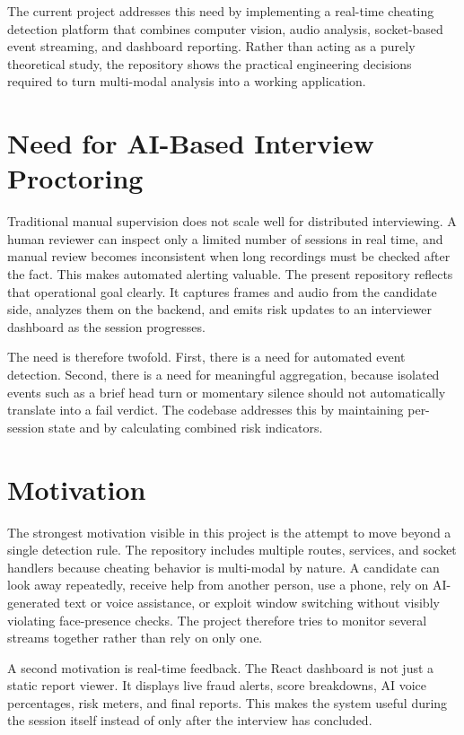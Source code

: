 \documentclass[12pt,a4paper]{extreport}
\begin{document}
The current project addresses this need by implementing a real-time cheating detection platform that combines computer vision, audio analysis, socket-based event streaming, and dashboard reporting. Rather than acting as a purely theoretical study, the repository shows the practical engineering decisions required to turn multi-modal analysis into a working application.

\section{Need for AI-Based Interview Proctoring}
Traditional manual supervision does not scale well for distributed interviewing. A human reviewer can inspect only a limited number of sessions in real time, and manual review becomes inconsistent when long recordings must be checked after the fact. This makes automated alerting valuable. The present repository reflects that operational goal clearly. It captures frames and audio from the candidate side, analyzes them on the backend, and emits risk updates to an interviewer dashboard as the session progresses.

The need is therefore twofold. First, there is a need for automated event detection. Second, there is a need for meaningful aggregation, because isolated events such as a brief head turn or momentary silence should not automatically translate into a fail verdict. The codebase addresses this by maintaining per-session state and by calculating combined risk indicators.

\section{Motivation}
The strongest motivation visible in this project is the attempt to move beyond a single detection rule. The repository includes multiple routes, services, and socket handlers because cheating behavior is multi-modal by nature. A candidate can look away repeatedly, receive help from another person, use a phone, rely on AI-generated text or voice assistance, or exploit window switching without visibly violating face-presence checks. The project therefore tries to monitor several streams together rather than rely on only one.

A second motivation is real-time feedback. The React dashboard is not just a static report viewer. It displays live fraud alerts, score breakdowns, AI voice percentages, risk meters, and final reports. This makes the system useful during the session itself instead of only after the interview has concluded.
\end{document}
